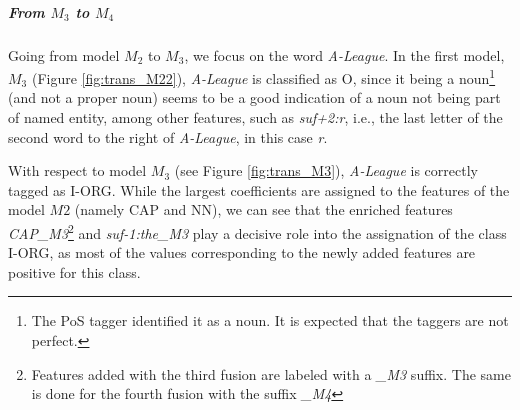\subparagraph{From $M_3$ to $M_4$} Going from model $M_2$ to $M_3$, we focus on the word \textit{A-League}. In the first model, $M_3$ (Figure \ref{fig:trans_M22}), \textit{A-League} is classified as O, since it being a  noun\footnote{The PoS tagger identified it as a noun. It is expected that the taggers are not perfect.} (and not a proper noun) seems to be a good indication of a noun not being part of named entity, among other features, such as \textit{suf+2:r}, i.e., the last letter of the second word to the right of \textit{A-League}, in this case \textit{r}. 

With respect to model $M_3$ (see Figure \ref{fig:trans_M3}), \textit{A-League} is correctly tagged as I-ORG. While the largest coefficients are assigned to the features of the model $M2$ (namely CAP and NN), we can see that the enriched features \textit{CAP\_M3}\footnote{Features added with the third fusion are labeled with a \textit{\_M3} suffix. The same is done for the fourth fusion with the suffix \textit{\_M4}} and \textit{suf-1:the\_M3} play a decisive role into the assignation of the class I-ORG, as most of the values corresponding to the newly added features are positive for this class.



